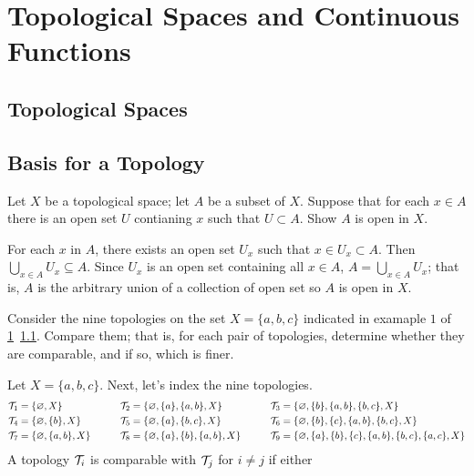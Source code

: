 \chapter{Topological Spaces and Continuous Functions}
\label{ch2}

\section{Topological Spaces}
\label{ch2sec1}

\section{Basis for a Topology}

\begin{exercise}
\item
  Let \(X\) be a topological space; let \(A\) be a subset of \(X\).
  Suppose that for each \(x\in A\) there is an open set \(U\) contianing \(x\)
  such that \(U\subset A\).
  Show \(A\) is open in \(X\).
  \par\smallskip
  For each \(x\) in \(A\), there exists an open set \(U_x\) such that
  \(x\in U_x\subset A\).
  Then \(\bigcup_{x\in A}U_x\subseteq A\).
  Since \(U_x\) is an open set containing all \(x\in A\),
  \(A = \bigcup_{x\in A}U_x\); that is, \(A\) is the arbitrary union of a
  collection of open set so \(A\) is open in \(X\).
\item
  Consider the nine topologies on the set \(X = \{a,b,c\}\) indicated in
  examaple \(1\) of \cref{ch2}~\cref{ch2sec1}.
  Compare them; that is, for each pair of topologies, determine whether they
  are comparable, and if so, which is finer.
  \par\smallskip
  Let \(X = \{a,b,c\}\).
  Next, let's index the nine topologies.
  \begin{align*}
    \mathcal{T}_1 & = \{\varnothing, X\} & \qquad
    \mathcal{T}_2 & = \{\varnothing, \{a\}, \{a, b\}, X\} & \qquad
    \mathcal{T}_3 & = \{\varnothing, \{b\}, \{a, b\}, \{b, c\}, X\}\\
    \mathcal{T}_4 & = \{\varnothing, \{b\}, X\} & \qquad
    \mathcal{T}_5 & = \{\varnothing, \{a\}, \{b, c\}, X\} & \qquad
    \mathcal{T}_6 & = \{\varnothing, \{b\}, \{c\}, \{a, b\}, \{b, c\}, X\}\\
    \mathcal{T}_7 & = \{\varnothing, \{a, b\}, X\} & \qquad
    \mathcal{T}_8 & = \{\varnothing, \{a\}, \{b\}, \{a, b\}, X\} & \qquad
    \mathcal{T}_9
    & = \{\varnothing, \{a\}, \{b\}, \{c\}, \{a, b\}, \{b, c\}, \{a, c\}, X\}
  \end{align*}
  A topology \(\mathcal{T}_i\) is comparable with \(\mathcal{T}_j\) for \(i\neq j\) if either

\end{exercise}
